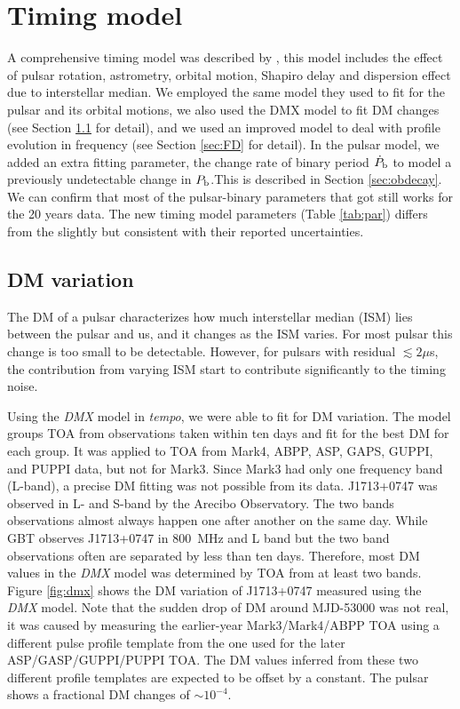 \section{Timing model}
\label{sec:model}
A comprehensive timing model was described by \citet{sns+05}, this model includes the effect of pulsar rotation, astrometry, orbital motion, Shapiro delay and dispersion effect due to interstellar median.
We employed the same \citet{dd86} model they used to fit for the pulsar and
its orbital motions, we also used the DMX model to fit DM changes (see Section
\ref{sec:dmx} for detail), and we used an improved model to deal with profile
evolution in frequency (see Section \ref{sec:FD} for detail). 
In the pulsar model, we added an extra fitting parameter, the change rate of binary period $\dot{P}_{\rm b}$ to model a previously undetectable change in $P_{\rm b}$.This is described in Section \ref{sec:obdecay}.    
We can confirm that most of the pulsar-binary parameters that \citet{sns+05} got still works for the 20 years data. The new timing model parameters (Table \ref{tab:par}) differs from the \citet{sns+05} slightly but consistent with their reported uncertainties.


\subsection{DM variation}
\label{sec:dmx}
The DM of a pulsar characterizes how much interstellar median (ISM) lies
between the pulsar and us, and it changes as the ISM varies. For most pulsar
this change is too small to be detectable. However, for pulsars with residual
$\lesssim2\mu$s, the contribution from varying ISM start to contribute
significantly to the timing noise. 

Using the {\it DMX} model in {\it tempo}, we were able to fit for DM
variation. 
The model groups TOA from observations taken within ten days and fit for the
best DM for each group.   
It was applied to TOA from Mark4, ABPP, ASP, GAPS, GUPPI, and PUPPI data, but
not for Mark3. Since Mark3 had only one frequency band (L-band), a precise DM
fitting was not possible from its data.
J1713+0747 was observed in L- and S-band by the Arecibo Observatory. The
two bands observations almost always happen one after another on the same day.
While GBT observes J1713+0747 in 800~MHz and L band but the two band
observations often are separated by less than ten days.
Therefore, most DM values in the {\it DMX} model was determined by TOA from at
least two bands. Figure \ref{fig:dmx} shows the DM variation of J1713+0747 
measured using the {\it DMX} model.
Note that the sudden drop of DM around MJD-53000 was not real, it was caused
by measuring the earlier-year Mark3/Mark4/ABPP TOA using a
different pulse profile template from the one used for the later
ASP/GASP/GUPPI/PUPPI TOA. The DM values inferred from these two different profile
templates are expected to be offset by a constant.
The pulsar shows a fractional DM changes of $\sim10^{-4}$.



